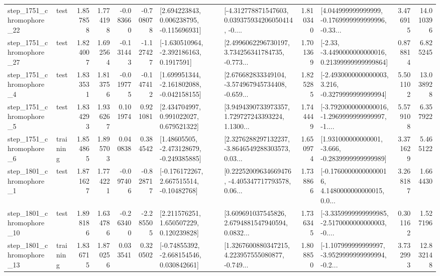 \begin{tabular}{llrrrrllrlrr}
 step\_1751\_chromophore\_22 &      test &      1.857858 &    1.774198 &     -0.083660 & -0.708078 &    [2.694223843, 0.006238795, -0.115696931] &  [-4.312778871547603, 0.039375934206050414, -0.... &       1.810340 &  [4.044999999999999, -0.1769999999999996, -0.33... &            3.476915 &         14.010396 \\
 step\_1751\_chromophore\_27 &      test &      1.824007 &    1.692564 &     -0.131443 & -1.127427 &     [-1.630510964, -2.392186163, 0.1917591] &  [2.4996062296730197, 3.734256341784735, -0.773... &       1.701369 &  [-2.33, -3.4490000000000016, 0.21399999999999864] &            0.878814 &          6.825245 \\
  step\_1751\_chromophore\_4 &      test &      1.833531 &    1.813756 &     -0.019775 & -0.147412 &   [1.699951344, -2.161802088, -0.042158155] &  [2.676682833349104, -3.574967945734408, -0.659... &       1.825285 &  [-2.4930000000000003, 3.216, -0.3279999999999994] &            5.501102 &         13.038928 \\
  step\_1751\_chromophore\_5 &      test &      1.834293 &    1.936267 &      0.101974 &  0.921081 &     [2.434704997, 0.991022027, 0.679521322] &  [3.9494390733973357, 1.729727243393224, 1.1300... &       1.744449 &  [-3.7920000000000016, -1.2969999999999997, -1.... &            5.579108 &          6.357922 \\
  step\_1751\_chromophore\_6 &  training &      1.854865 &    1.895703 &      0.040838 &  0.384542 &    [1.48605505, -2.473128679, -0.249385885] &  [2.3276288297132237, -3.8646549288303573, 0.03... &       1.650974 &   [1.931000000000001, -3.666, -0.2839999999999989] &            3.371629 &          5.465122 \\
  step\_1801\_chromophore\_1 &      test &      1.871627 &    1.774221 &     -0.097406 & -0.828717 &    [-0.176172267, 2.667515514, -0.10482768] &  [0.22252009634669476, -4.405347717793578, 0.06... &       1.738866 &  [-0.17600000000000016, 4.1480000000000015, 0.0... &            3.268187 &          1.664430 \\
 step\_1801\_chromophore\_10 &      test &      1.898186 &    1.634786 &     -0.263400 & -2.285505 &     [2.211576251, 1.650507229, 0.120239828] &  [3.609691037545826, 2.6794881547940594, 0.0832... &       1.736345 &  [-3.3359999999999985, -2.5170000000000003, -0.... &            0.301162 &          1.527196 \\
 step\_1801\_chromophore\_13 &  training &      1.836715 &    1.870256 &      0.033541 &  0.320502 &    [-0.74855392, -2.668154546, 0.030842661] &  [1.3267600880347215, 4.223957555080877, -0.749... &       1.808850 &  [-1.107999999999997, -3.9529999999999994, -0.2... &            3.732993 &         12.832148 \\

\end{tabular}
